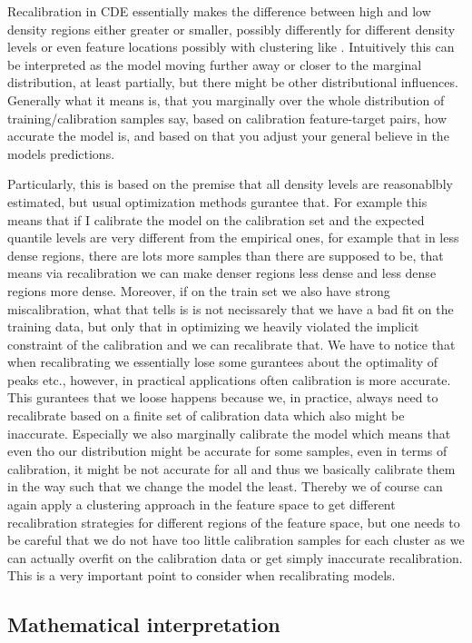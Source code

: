 Recalibration in CDE essentially makes the difference between high and low density regions either greater or smaller, possibly differently for different density levels or even feature locations possibly with clustering like \cite{izbicki2019flexible}. Intuitively this can be interpreted as the model moving further away or closer to the marginal distribution, at least partially, but there might be other distributional influences. Generally what it means is, that you marginally over the whole distribution of training/calibration samples say, based on calibration feature-target pairs, how accurate the model is, and based on that you adjust your general believe in the models predictions.

Particularly, this is based on the premise that all density levels are reasonablbly estimated, but usual optimization methods gurantee that. For example this means that if I calibrate the model on the calibration set and the expected quantile levels are very different from the empirical ones, for example that in less dense regions, there are lots more samples than there are supposed to be, that means via recalibration we can make denser regions less dense and less dense regions more dense. Moreover, if on the train set we also have strong miscalibration, what that tells is is not necissarely that we have a bad fit on the training data, but only that in optimizing we heavily violated the implicit constraint of the calibration and we can recalibrate that. We have to notice that when recalibrating we essentially lose some gurantees about the optimality of peaks etc., however, in practical applications often calibration is more accurate. This gurantees that we loose happens because we, in practice, always need to recalibrate based on a finite set of calibration data which also might be inaccurate. Especially we also marginally calibrate the model which means that even tho our distribution might be accurate for some samples, even in terms of calibration, it might be not accurate for all and thus we basically calibrate them in the way such that we change the model the least. Thereby we of course can again apply a clustering approach in the feature space to get different recalibration strategies for different regions of the feature space, but one needs to be careful that we do not have too little calibration samples for each cluster as we can actually overfit on the calibration data or get simply inaccurate recalibration. This is a very important point to consider when recalibrating models.

\subsection{Mathematical interpretation}

